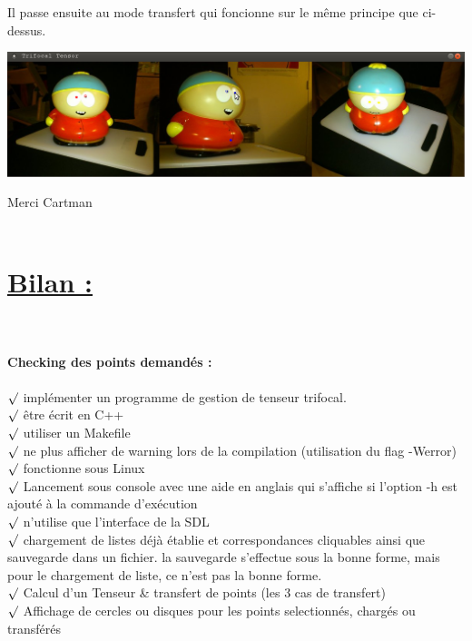 \documentclass[a4paper,11pt,fleqn]{report}
\begin{document}
	Il passe ensuite au mode transfert qui foncionne sur le m\^eme principe que ci-dessus.
	\begin{center}\includegraphics[scale=0.50]{./cartman2.png}\end{center}Merci Cartman\\\\
	\section{\underline{Bilan :}}
	\\\\
	\textbf{Checking des points demand\'es :}\\\\
	$\surd$ impl\'ementer un programme de gestion de tenseur trifocal.\\
	$\surd$ \^etre \'ecrit en C++\\
	$\surd$ utiliser un Makefile\\
	$\surd$ ne plus afficher de warning lors de la compilation (utilisation du flag -Werror)\\
	$\surd$ fonctionne sous Linux\\
	$\surd$ Lancement sous console avec une aide en anglais qui s'affiche si l'option -h est ajout\'e \`a la commande d'ex\'ecution\\
	$\surd$ n'utilise que l'interface de la SDL\\
	$\surd$ chargement de listes d\'ej\`a \'etablie et correspondances cliquables ainsi que sauvegarde dans un fichier. la sauvegarde s'effectue sous la bonne forme, mais pour le chargement de liste, ce n'est pas la bonne forme.\\
	$\surd$ Calcul d'un Tenseur & transfert de points (les 3 cas de transfert)\\
	$\surd$ Affichage de cercles ou disques pour les points selectionn\'es, charg\'es ou transf\'er\'es\\
		
\end{document}
